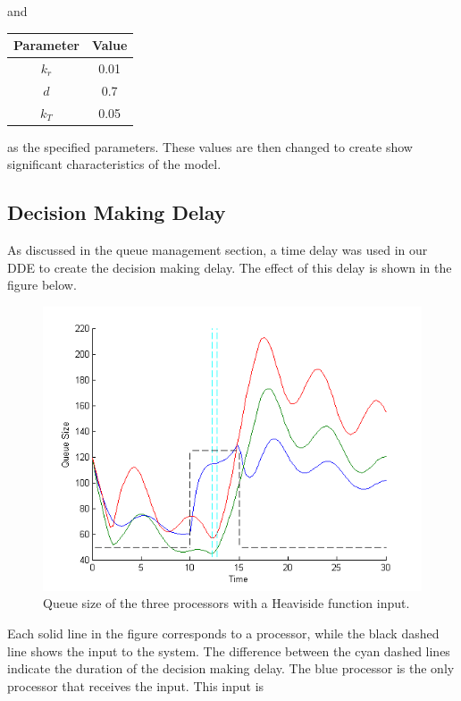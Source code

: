 \documentclass{article}
\begin{document}
\noindent
and

\begin{center}
\begin{tabular}{c|c}
Parameter & Value \\
\hline
$k_r$ & 0.01 \\
$d$ & 0.7 \\
$k_T$ & 0.05 \\
\end{tabular}
\end{center}

\noindent
as the specified parameters. These values are then changed to create show significant characteristics of the model. 

\subsection{Decision Making Delay}

As discussed in the queue management section,  a time delay was used in our DDE to create the decision making delay. The effect of this delay is shown in the figure below. 

\begin{figure}[H]
                \centering
                \includegraphics[width=0.8\linewidth]{Decision_making_delay}
                \caption{Queue size of the three processors with a Heaviside function input.}
\end{figure}

\noindent
Each solid line in the figure corresponds to a processor, while the black dashed line shows the input to the system. The difference between the cyan dashed lines indicate the duration of the decision making delay. The blue processor is the only processor that receives the input. This input is 
\end{document}
